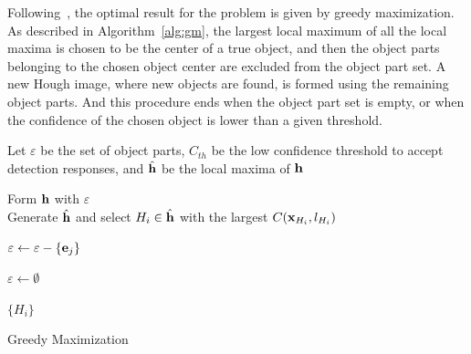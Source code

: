 Following~\citep{ac9}, the optimal result for the problem is given by greedy maximization. As described in Algorithm~\ref{alg:gm}, the largest local maximum of all the local maxima is chosen to be the center of a true object, and then the object parts belonging to the chosen object center are excluded from the object part set. A new Hough image, where new objects are found, is formed using the remaining object parts. And this procedure ends when the object part set is empty, or when the confidence of the chosen object is lower than a given threshold.

\begin{algorithm}[chapter]



     Let $\varepsilon$ be the set of object parts, $C_{th}$ be the low confidence threshold to accept detection responses, and $\hat{\bf{h}}$ be the local maxima of $\bf{h}$



    \begin{algorithmic}[1]




        \WHILE {$\varepsilon \ne \emptyset$}

            \STATE Form $\bf{h}$ with $\varepsilon$\\

            \STATE Generate $\hat{\bf{h}}$ and select $H_i \in {\hat{\bf{h}}} $ with the largest $   C({\bf{x}}_{H_i},l_{H_i})   $







                    \STATE $\varepsilon\leftarrow \varepsilon -\{ {\bf{e}}_j \}$

                    \ENDIF

                \ENDFOR

            \ELSE



                \STATE $\varepsilon\leftarrow \emptyset$

            \ENDIF

        \ENDWHILE
    \RETURN $\{H_i\}$

    \end{algorithmic}

      \caption{Greedy Maximization}
    \label{alg:gm}

\end{algorithm}




